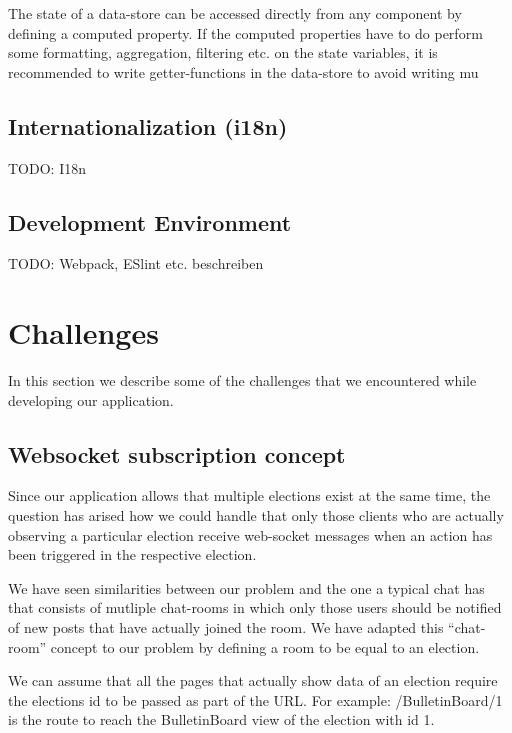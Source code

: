 The state of a data-store can be accessed directly from any component by defining a computed property. If the computed properties have to do perform some formatting, aggregation, filtering etc. on the state variables, it is recommended to write getter-functions in the data-store to avoid writing mu
 
\subsection{Internationalization (i18n)}
TODO: I18n

\subsection{Development Environment}
TODO: Webpack, ESlint etc. beschreiben

\section{Challenges}
In this section we describe some of the challenges that we encountered while developing our application. 
\subsection{Websocket subscription concept}
Since our application allows that multiple elections exist at the same time, the question has arised how we could handle that only those clients who are actually observing a particular election receive web-socket messages when an action has been triggered in the respective election.

We have seen similarities between our problem and the one a typical chat has that consists of mutliple chat-rooms in which only those users should be notified of new posts that have actually joined the room. We have adapted this "`chat-room"' concept to our problem by defining a room to be equal to an election.

We can assume that all the pages that actually show data of an election require the elections id to be passed as part of the URL. For example: /BulletinBoard/1 is the route to reach the BulletinBoard view of the election with id 1.

